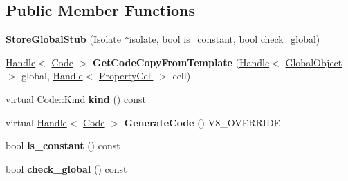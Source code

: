 \subsection*{Public Member Functions}
\begin{DoxyCompactItemize}
\item 
\hypertarget{classv8_1_1internal_1_1_store_global_stub_a339c705b7fa562810a1307e454cb705b}{}{\bfseries Store\+Global\+Stub} (\hyperlink{classv8_1_1internal_1_1_isolate}{Isolate} $\ast$isolate, bool is\+\_\+constant, bool check\+\_\+global)\label{classv8_1_1internal_1_1_store_global_stub_a339c705b7fa562810a1307e454cb705b}

\item 
\hypertarget{classv8_1_1internal_1_1_store_global_stub_af2584814d467048ff1133ca1d90a3c2a}{}\hyperlink{classv8_1_1internal_1_1_handle}{Handle}$<$ \hyperlink{classv8_1_1internal_1_1_code}{Code} $>$ {\bfseries Get\+Code\+Copy\+From\+Template} (\hyperlink{classv8_1_1internal_1_1_handle}{Handle}$<$ \hyperlink{classv8_1_1internal_1_1_global_object}{Global\+Object} $>$ global, \hyperlink{classv8_1_1internal_1_1_handle}{Handle}$<$ \hyperlink{classv8_1_1internal_1_1_property_cell}{Property\+Cell} $>$ cell)\label{classv8_1_1internal_1_1_store_global_stub_af2584814d467048ff1133ca1d90a3c2a}

\item 
\hypertarget{classv8_1_1internal_1_1_store_global_stub_a3009e28631b76a1f58e2f759120fe4f0}{}virtual Code\+::\+Kind {\bfseries kind} () const \label{classv8_1_1internal_1_1_store_global_stub_a3009e28631b76a1f58e2f759120fe4f0}

\item 
\hypertarget{classv8_1_1internal_1_1_store_global_stub_a95d1376ce03278a0490fd016cf7f5363}{}virtual \hyperlink{classv8_1_1internal_1_1_handle}{Handle}$<$ \hyperlink{classv8_1_1internal_1_1_code}{Code} $>$ {\bfseries Generate\+Code} () V8\+\_\+\+O\+V\+E\+R\+R\+I\+D\+E\label{classv8_1_1internal_1_1_store_global_stub_a95d1376ce03278a0490fd016cf7f5363}

\item 
\hypertarget{classv8_1_1internal_1_1_store_global_stub_a38088d101cf656a5c11404da5a997018}{}bool {\bfseries is\+\_\+constant} () const \label{classv8_1_1internal_1_1_store_global_stub_a38088d101cf656a5c11404da5a997018}

\item 
\hypertarget{classv8_1_1internal_1_1_store_global_stub_a7d9c9d034bcc5d5ba93c0d4b2d1fdf45}{}bool {\bfseries check\+\_\+global} () const \label{classv8_1_1internal_1_1_store_global_stub_a7d9c9d034bcc5d5ba93c0d4b2d1fdf45}


\end{DoxyCompactItemize}
